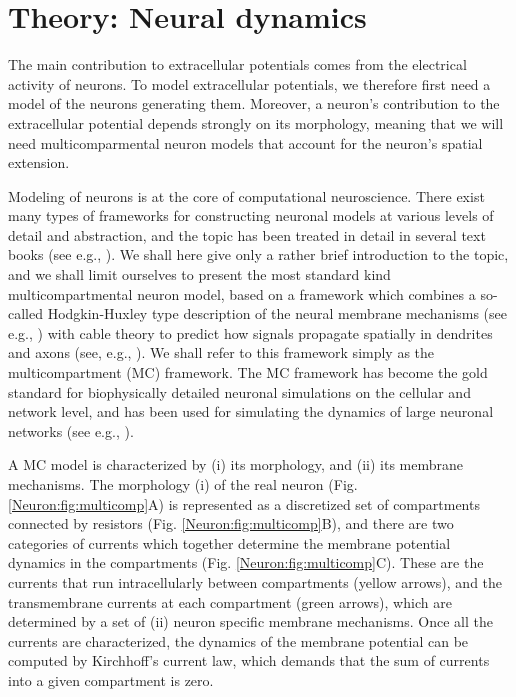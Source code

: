 \chapter{Theory: Neural dynamics}
\label{sec:Neuron}
The main contribution to extracellular potentials comes from the electrical activity of neurons. To model extracellular potentials, we therefore first need a model of the neurons generating them. Moreover, a neuron's contribution to the extracellular potential depends strongly on its morphology,
meaning that we will need multicomparmental neuron models  that account for the neuron's spatial extension.

Modeling of neurons is at the core of computational neuroscience. There exist many types of frameworks for constructing neuronal models at various levels of detail and abstraction, and the topic has been treated in detail in several text books (see e.g., \cite{johnston1994foundations,KockSegev1998,Koch1999,DeSchutter2000,Hille2001,Dayan2005,Sterratt2011}). We shall here give only a rather brief introduction to the topic, and we shall limit ourselves to present the most standard kind multicompartmental neuron model, based on a framework which combines a so-called Hodgkin-Huxley type description of the neural membrane mechanisms (see e.g., \cite{Hodgkin1952,KockSegev1998,Pospischil2008}) with cable theory to predict how signals propagate spatially in dendrites and axons (see, e.g., \cite{Koch1999,rall2011}). We shall refer to this framework simply as the multicompartment (MC) framework. The MC framework has become the gold standard for biophysically detailed neuronal simulations on the cellular and network level, and has been used for simulating the dynamics of large neuronal networks (see e.g., \cite{traub2005,markram2015,arkhipov2018}).

A MC model is characterized by (i) its morphology, and (ii) its membrane mechanisms. The morphology (i) of the real neuron (Fig. \ref{Neuron:fig:multicomp}A) is represented as a discretized set of compartments connected by resistors (Fig. \ref{Neuron:fig:multicomp}B), and there are two categories of currents which together determine the membrane potential dynamics in the compartments (Fig. \ref{Neuron:fig:multicomp}C). These are the currents that run intracellularly between compartments (yellow arrows), and the transmembrane currents at each compartment (green arrows), which are determined by a set of (ii) neuron specific membrane mechanisms. Once all the currents are characterized, the dynamics of the membrane potential can be computed by Kirchhoff's current law, which demands that the sum of currents into a given compartment is zero.

